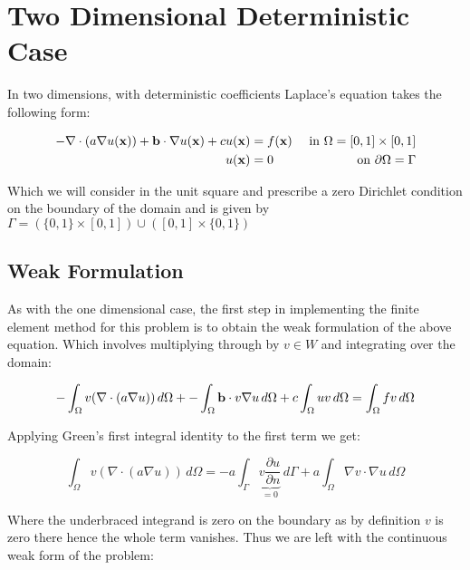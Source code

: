 \chapter{Two Dimensional Deterministic Case}

In two dimensions, with deterministic coefficients Laplace's equation takes the
following form:

\begin{equation}\label{eq:two-d-deterministic}
\begin{aligned}
    -\nabla\cdot(a\nabla u(\mathbf{x})) + \mathbf{b} \cdot \nabla u(\mathbf{x}) + c u(\mathbf{x}) &= f(\mathbf{x})
                               &\text{ in } \Omega = [0,1] \times [0,1] \\
    u(\mathbf{x}) &= 0 &\text{ on } \partial\Omega = \Gamma
\end{aligned}
\end{equation}

Which we will consider in the unit square and prescribe a zero Dirichlet
condition on the boundary of the domain and is given by
$\Gamma = (\{0,1\} \times [0,1]) \cup ([0,1] \times \{0,1\})$

\section{Weak Formulation}


As with the one dimensional case, the first step in implementing the finite
element method for this problem is to obtain the weak formulation of the above
equation. Which involves multiplying through by $v \in W$ and integrating over
the domain:

\begin{equation}
    -\int_{\Omega}{v(\nabla\cdot(a\nabla{u}))}\,d\Omega +
    -\int_{\Omega}\mathbf{b}\cdot v\nabla{u}\,d\Omega +
    c\int_{\Omega}uv\,d\Omega = \int_{\Omega}fv\,d\Omega
\end{equation}

Applying Green's first integral identity to the first term we get:

\begin{equation}
    \int_{\Omega}v(\nabla\cdot(a\nabla u))\, d\Omega =
    -a\int_{\Gamma}\underbrace{v\frac{\partial{u}}{\partial{n}}}_{ =0} \,d\Gamma
    + a\int_{\Omega}\nabla{v}\cdot\nabla{u}\,d\Omega
\end{equation}

Where the underbraced integrand is zero on the boundary as by definition $v$ is
zero there hence the whole term vanishes. Thus we are left with the continuous
weak form of the problem:

